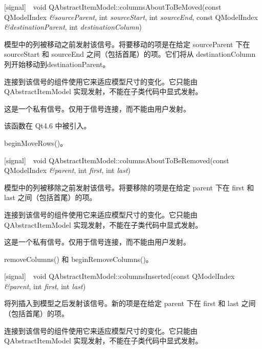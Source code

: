 [signal] void QAbstractItemModel::columnsAboutToBeMoved(const QModelIndex \emph{\&sourceParent}, int \emph{sourceStart}, int \emph{sourceEnd}, const QModelIndex \emph{\&destinationParent}, int \emph{destinationColumn})

模型中的列被移动之前发射该信号。将要移动的项是在给定 sourceParent 下在 sourceStart 和 sourceEnd 之间（包括首尾）的项。它们将从 destinationColumn 列开始移动到destinationParent。
 
\begin{notice}
连接到该信号的组件使用它来适应模型尺寸的变化。它只能由 QAbstractItemModel 实现发射，不能在子类代码中显式发射。
\end{notice}

\begin{notice}
这是一个私有信号。仅用于信号连接，而不能由用户发射。
\end{notice}

该函数在 Qt4.6 中被引入。

\begin{seeAlso}
beginMoveRows()。
\end{seeAlso}

[signal] void QAbstractItemModel::columnsAboutToBeRemoved(const QModelIndex \emph{\&parent}, int \emph{first}, int \emph{last})

模型中的列被移除之前发射该信号。将要移除的项是在给定 parent 下在 first 和 last 之间（包括首尾）的项。

\begin{notice}
连接到该信号的组件使用它来适应模型尺寸的变化。它只能由 QAbstractItemModel 实现发射，不能在子类代码中显式发射。 
\end{notice}

\begin{notice}
这是一个私有信号。仅用于信号连接，而不能由用户发射。
\end{notice} 

\begin{seeAlso}
removeColumns() 和 beginRemoveColumns()。
\end{seeAlso}

[signal] void QAbstractItemModel::columnsInserted(const QModelIndex \emph{\&parent}, int \emph{first}, int \emph{last})

将列插入到模型之后发射该信号。新的项是在给定 parent 下在 first 和 last 之间（包括首尾）的项。

\begin{notice}
连接到该信号的组件使用它来适应模型尺寸的变化。它只能由 QAbstractItemModel 实现发射，不能在子类代码中显式发射。
\end{notice}

